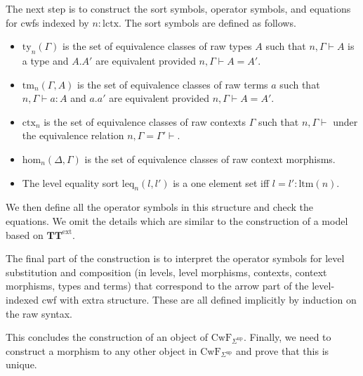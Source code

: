 \documentclass[11pt,a4paper]{article}
\theoremstyle{plain}
\theoremstyle{definition}
\newcommand{\UU}{\mathsf{U}}
\def\UU{\mathsf{U}}
\def\sub{\mathrm{hom}}
\def\lctx{\mathrm{lctx}}
\def\ltm{\mathrm{ltm}}
\def\leq{\mathrm{leq}}
\newcommand{\ctx}{\mathrm{ctx}}
\newcommand{\ty}{\mathrm{ty}}
\newcommand{\tm}{\mathrm{tm}}
\newcommand{\Ta}{\mathrm{T}}
\def\CwF{\mathrm{CwF}}
\def\Sigmaint{{\Sigma^\mathrm{up}}}
\def\TText{{\mathbf{TT}^\mathrm{ext}}}
\begin{document}
The next step is to construct the sort symbols, operator symbols, and equations for cwfs indexed by $n : \lctx$. The sort symbols are defined as follows.
\begin{itemize}
\item $\ty_n(\Gamma)$ is the set of equivalence classes of raw types $A$ such that $n, \Gamma \vdash A$ is a type and $A.A'$ are equivalent provided $n, \Gamma \vdash A = A'$.
\item $\tm_n(\Gamma,A)$ is the set of equivalence classes of raw terms $a$ such that $n, \Gamma \vdash a : A$ and $a.a'$ are equivalent provided $n, \Gamma \vdash A = A'$.
\item $\ctx_n$ is the set of equivalence classes of raw contexts $\Gamma$ such that $n, \Gamma \vdash$ under the equivalence relation $n, \Gamma = \Gamma' \vdash$.
\item $\sub_n(\Delta,\Gamma)$ is the set of equivalence classes of raw context morphisms.
\item The level equality sort $\leq_n(l,l')$ is a one element set iff $l = l' : \ltm(n)$.
\end{itemize}
We then define all the operator symbols in this structure and check the equations. We omit the details which are similar to the construction of a model based on $\TText$.

The final part of the construction is to interpret the operator symbols for level substitution and composition (in levels, level morphisms, contexts, context morphisms, types and terms) that correspond to the arrow part of the level-indexed cwf with extra structure. These are all defined implicitly by induction on the raw syntax.

This concludes the construction of an object of $\CwF_\Sigmaint$. Finally, we need to construct a morphism to any other object in $\CwF_\Sigmaint$ and prove that this is unique.


\end{document}
